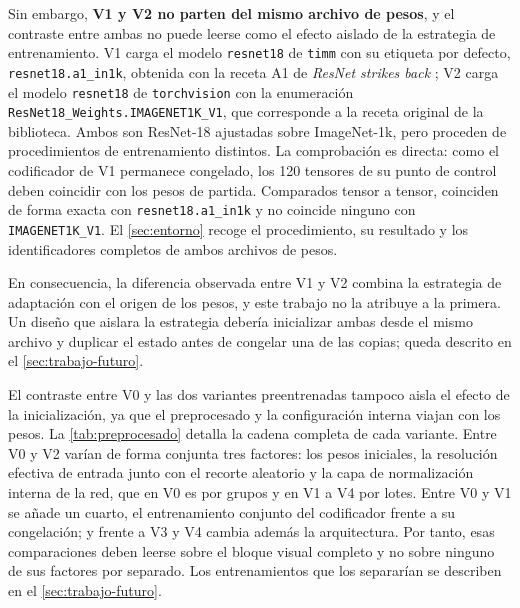 Sin embargo, \textbf{V1 y V2 no parten del mismo archivo de pesos}, y el contraste entre
ambas no puede leerse como el efecto aislado de la estrategia de entrenamiento. V1 carga
el modelo \texttt{resnet18} de \texttt{timm} con su etiqueta por defecto,
\texttt{resnet18.a1\_in1k}, obtenida con la receta A1 de \textit{ResNet strikes back}
\cite{wightman2021resnetsb}; V2 carga el modelo \texttt{resnet18} de
\texttt{torchvision} con la enumeraci\'on \texttt{ResNet18\_Weights.IMAGENET1K\_V1}, que
corresponde a la receta original de la biblioteca. Ambos son ResNet-18 ajustadas sobre
ImageNet-1k, pero proceden de procedimientos de entrenamiento distintos. La comprobaci\'on
es directa: como el codificador de V1 permanece congelado, los \num{120} tensores de su
punto de control deben coincidir con los pesos de partida. Comparados tensor a tensor,
coinciden de forma exacta con \texttt{resnet18.a1\_in1k} y no coincide ninguno con
\texttt{IMAGENET1K\_V1}. El \cref{sec:entorno} recoge el procedimiento, su resultado y los
identificadores completos de ambos archivos de pesos.

En consecuencia, la diferencia observada entre V1 y V2 combina la estrategia de
adaptaci\'on con el origen de los pesos, y este trabajo no la atribuye a la primera. Un
dise\~no que aislara la estrategia deber\'ia inicializar ambas desde el mismo archivo y
duplicar el estado antes de congelar una de las copias; queda descrito en el
\cref{sec:trabajo-futuro}.

El contraste entre V0 y las dos variantes preentrenadas tampoco aisla el efecto de la
inicializaci\'on, ya que el preprocesado y la configuraci\'on interna viajan con los
pesos. La \cref{tab:preprocesado} detalla la cadena completa de cada variante. Entre V0 y
V2 var\'ian de forma conjunta tres factores: los pesos iniciales, la resoluci\'on efectiva
de entrada junto con el recorte aleatorio y la capa de normalizaci\'on interna de la red,
que en V0 es por grupos y en V1 a V4 por lotes. Entre V0 y V1 se a\~nade un cuarto, el
entrenamiento conjunto del codificador frente a su congelaci\'on; y frente a V3 y V4
cambia adem\'as la arquitectura. Por tanto, esas comparaciones deben leerse sobre el
bloque visual completo y no sobre ninguno de sus factores por separado. Los entrenamientos
que los separar\'ian se describen en el \cref{sec:trabajo-futuro}.

